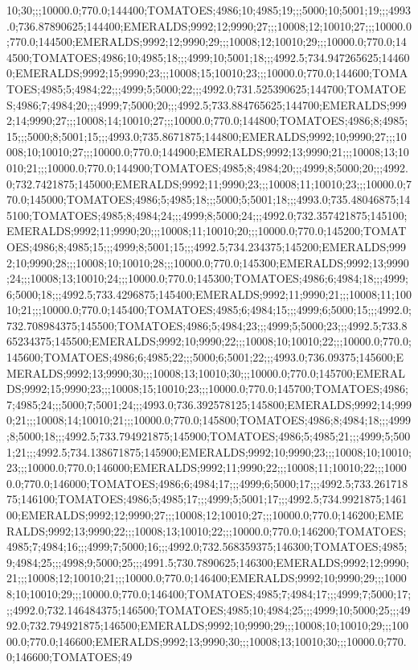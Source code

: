 10;30;;;10000.0;770.0;144400;TOMATOES;4986;10;4985;19;;;5000;10;5001;19;;;4993.0;736.87890625;144400;EMERALDS;9992;12;9990;27;;;10008;12;10010;27;;;10000.0;770.0;144500;EMERALDS;9992;12;9990;29;;;10008;12;10010;29;;;10000.0;770.0;144500;TOMATOES;4986;10;4985;18;;;4999;10;5001;18;;;4992.5;734.947265625;144600;EMERALDS;9992;15;9990;23;;;10008;15;10010;23;;;10000.0;770.0;144600;TOMATOES;4985;5;4984;22;;;4999;5;5000;22;;;4992.0;731.525390625;144700;TOMATOES;4986;7;4984;20;;;4999;7;5000;20;;;4992.5;733.884765625;144700;EMERALDS;9992;14;9990;27;;;10008;14;10010;27;;;10000.0;770.0;144800;TOMATOES;4986;8;4985;15;;;5000;8;5001;15;;;4993.0;735.8671875;144800;EMERALDS;9992;10;9990;27;;;10008;10;10010;27;;;10000.0;770.0;144900;EMERALDS;9992;13;9990;21;;;10008;13;10010;21;;;10000.0;770.0;144900;TOMATOES;4985;8;4984;20;;;4999;8;5000;20;;;4992.0;732.7421875;145000;EMERALDS;9992;11;9990;23;;;10008;11;10010;23;;;10000.0;770.0;145000;TOMATOES;4986;5;4985;18;;;5000;5;5001;18;;;4993.0;735.48046875;145100;TOMATOES;4985;8;4984;24;;;4999;8;5000;24;;;4992.0;732.357421875;145100;EMERALDS;9992;11;9990;20;;;10008;11;10010;20;;;10000.0;770.0;145200;TOMATOES;4986;8;4985;15;;;4999;8;5001;15;;;4992.5;734.234375;145200;EMERALDS;9992;10;9990;28;;;10008;10;10010;28;;;10000.0;770.0;145300;EMERALDS;9992;13;9990;24;;;10008;13;10010;24;;;10000.0;770.0;145300;TOMATOES;4986;6;4984;18;;;4999;6;5000;18;;;4992.5;733.4296875;145400;EMERALDS;9992;11;9990;21;;;10008;11;10010;21;;;10000.0;770.0;145400;TOMATOES;4985;6;4984;15;;;4999;6;5000;15;;;4992.0;732.708984375;145500;TOMATOES;4986;5;4984;23;;;4999;5;5000;23;;;4992.5;733.865234375;145500;EMERALDS;9992;10;9990;22;;;10008;10;10010;22;;;10000.0;770.0;145600;TOMATOES;4986;6;4985;22;;;5000;6;5001;22;;;4993.0;736.09375;145600;EMERALDS;9992;13;9990;30;;;10008;13;10010;30;;;10000.0;770.0;145700;EMERALDS;9992;15;9990;23;;;10008;15;10010;23;;;10000.0;770.0;145700;TOMATOES;4986;7;4985;24;;;5000;7;5001;24;;;4993.0;736.392578125;145800;EMERALDS;9992;14;9990;21;;;10008;14;10010;21;;;10000.0;770.0;145800;TOMATOES;4986;8;4984;18;;;4999;8;5000;18;;;4992.5;733.794921875;145900;TOMATOES;4986;5;4985;21;;;4999;5;5001;21;;;4992.5;734.138671875;145900;EMERALDS;9992;10;9990;23;;;10008;10;10010;23;;;10000.0;770.0;146000;EMERALDS;9992;11;9990;22;;;10008;11;10010;22;;;10000.0;770.0;146000;TOMATOES;4986;6;4984;17;;;4999;6;5000;17;;;4992.5;733.26171875;146100;TOMATOES;4986;5;4985;17;;;4999;5;5001;17;;;4992.5;734.9921875;146100;EMERALDS;9992;12;9990;27;;;10008;12;10010;27;;;10000.0;770.0;146200;EMERALDS;9992;13;9990;22;;;10008;13;10010;22;;;10000.0;770.0;146200;TOMATOES;4985;7;4984;16;;;4999;7;5000;16;;;4992.0;732.568359375;146300;TOMATOES;4985;9;4984;25;;;4998;9;5000;25;;;4991.5;730.7890625;146300;EMERALDS;9992;12;9990;21;;;10008;12;10010;21;;;10000.0;770.0;146400;EMERALDS;9992;10;9990;29;;;10008;10;10010;29;;;10000.0;770.0;146400;TOMATOES;4985;7;4984;17;;;4999;7;5000;17;;;4992.0;732.146484375;146500;TOMATOES;4985;10;4984;25;;;4999;10;5000;25;;;4992.0;732.794921875;146500;EMERALDS;9992;10;9990;29;;;10008;10;10010;29;;;10000.0;770.0;146600;EMERALDS;9992;13;9990;30;;;10008;13;10010;30;;;10000.0;770.0;146600;TOMATOES;49